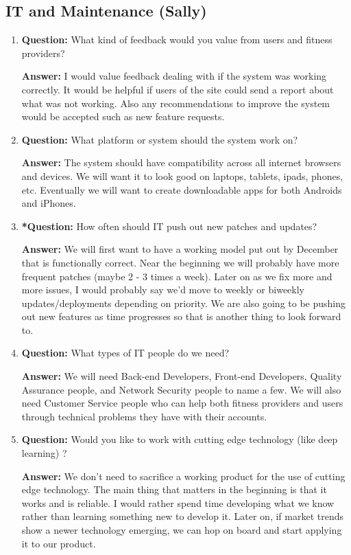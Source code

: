 \documentclass[12pt]{article}
\begin{document}
\subsection{IT and Maintenance (Sally)}
\begin{enumerate}
\item \textbf{Question:} What kind of feedback would you value from users and fitness providers?

\textbf{Answer:} I would value feedback dealing with if the system was working correctly.  It would be helpful if users of the site could send a report about what was not working.  Also any recommendations to improve the system would be accepted such as new feature requests.

\item \textbf{Question:} What platform or system should the system work on? 

\textbf{Answer:}  The system should have compatibility across all internet browsers and devices.  We will want it to look good on laptops, tablets, ipads, phones, etc.  Eventually we will want to create downloadable apps for both Androids and iPhones.

\item \textbf{*Question:} How often should IT push out new patches and updates?

\textbf{Answer:} We will first want to have a working model put out by December that is functionally correct.  Near the beginning we will probably have more frequent patches (maybe 2 - 3 times a week).  Later on as we fix more and more issues, I would probably say we’d move to weekly or biweekly updates/deployments depending on priority.  We are also going to be pushing out new features as time progresses so that is another thing to look forward to.

\item \textbf{Question:} What types of IT people do we need?

\textbf{Answer:} We will need Back-end Developers, Front-end Developers, Quality Assurance people, and Network Security people to name a few.  We will also need Customer Service people who can help both fitness providers and users through technical problems they have with their accounts.

\item \textbf{Question:} Would you like to work with cutting edge technology (like deep learning) ? 

\textbf{Answer:} We don’t need to sacrifice a working product for the use of cutting edge technology. The main thing that matters in the beginning is that it works and is reliable. I would rather spend time developing what we know rather than learning something new to develop it.  Later on, if market trends show a newer technology emerging, we can hop on board and start applying it to our product.

\end{enumerate}
\end{document}
